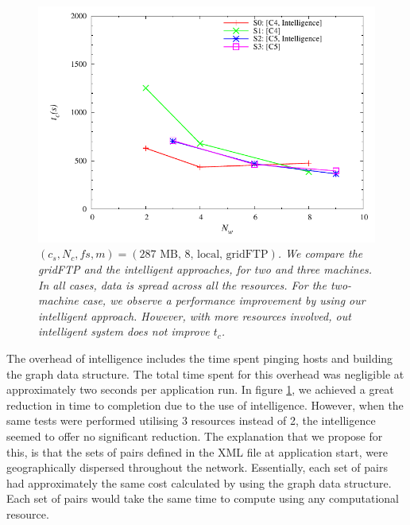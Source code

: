 \documentclass{rspublic}
\newcommand{\micnote}[1]{ {\textcolor{blue} { ***Michael: #1 }}}
\newcommand{\betynote}[1]{ {\textcolor{orange} { ***Bety: #1 }}}
\newcommand{\jhanote}[1]{} \newcommand{\micnote}[1]{}\newcommand{\betynote}[1]{} \newcommand{\fixme}[1]{}
\begin{document}

\begin{figure}[!ht]
\begin{center}
   \includegraphics[scale=0.5] {data/graphs/IntelligentFigure}
\end{center}
\caption{\textit{$(c_s, N_c, fs, m)=(\mbox{287 MB, 8, local, gridFTP})$. We compare the gridFTP and the intelligent approaches, for two and three machines. In all cases, data is spread across all the resources.  For the two-machine case, we observe a performance improvement by using our intelligent approach. However, with more resources involved, out intelligent system does not improve $t_c$.}}
\label{Fig:IntelligentExp}
\end{figure}


The overhead of intelligence includes the time spent pinging hosts and
building the graph data structure. The total time spent for this
overhead was negligible at approximately two seconds per application
run. In figure \ref{Fig:IntelligentExp}, we achieved a great reduction
in time to completion due to the use of intelligence.  However, when the
same tests were performed utilising 3 resources instead of 2, the
intelligence seemed to offer no significant reduction. The explanation
that we propose for this, is that the sets of pairs defined in the XML
file at application start, were geographically dispersed throughout the
network.  Essentially, each set of pairs had approximately the same cost
calculated by using the graph data structure. Each set of pairs would
take the same time to compute using any computational resource.
\jhanote{Perhaps define a test to verify this, so a note can go in
saying we investigated this}
\end{document}
